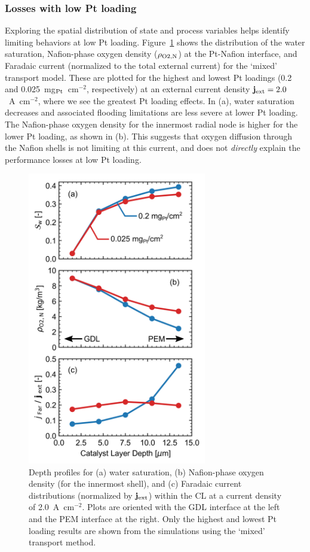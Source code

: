 \documentclass[final,3p,times,twocolumn]{elsarticle}    %
\begin{document}
\subsubsection{Losses with low Pt loading}
\label{sect:cause-of-losses}

Exploring the spatial distribution of state and process variables helps identify limiting behaviors at low Pt loading. Figure~\ref{fig:cause-of-losses} shows the distribution of the water saturation, Nafion-phase oxygen density ($\rho_{\rm O2,N}$) at the Pt-Nafion interface, and Faradaic current (normalized to the total external current) for the `mixed' transport model. These are plotted for the highest and lowest Pt loadings (0.2 and 0.025~mg$_{\rm Pt}$~cm$^{-2}$, respectively) at an external current density ${\bf j}_{\rm ext} = 2.0$~A~cm$^{-2}$, where we see the greatest Pt loading effects. In (a), water saturation decreases and associated flooding limitations are less severe at lower Pt loading. The Nafion-phase oxygen density for the innermost radial node is higher for the lower Pt loading, as shown in (b). This suggests that oxygen diffusion through the Nafion shells is not limiting at this current, and does not \emph{directly} explain the performance losses at low Pt loading. 

\begin{figure}[!tb]
    \centering
    \includegraphics[width=3.07in]{figures/cause-of-losses-vert-3_07in.png}
    \caption{Depth profiles for (a) water saturation, (b) Nafion-phase oxygen density (for the innermost shell), and (c) Faradaic current distributions (normalized by ${\bf j}_{\rm ext}$) within the CL at a current density of 2.0~A~cm$^{-2}$. Plots are oriented with the GDL interface at the left and the PEM interface at the right. Only the highest and lowest Pt loading results are shown from the simulations using the `mixed' transport method.}
    \label{fig:cause-of-losses}
\end{figure}
\end{document}
